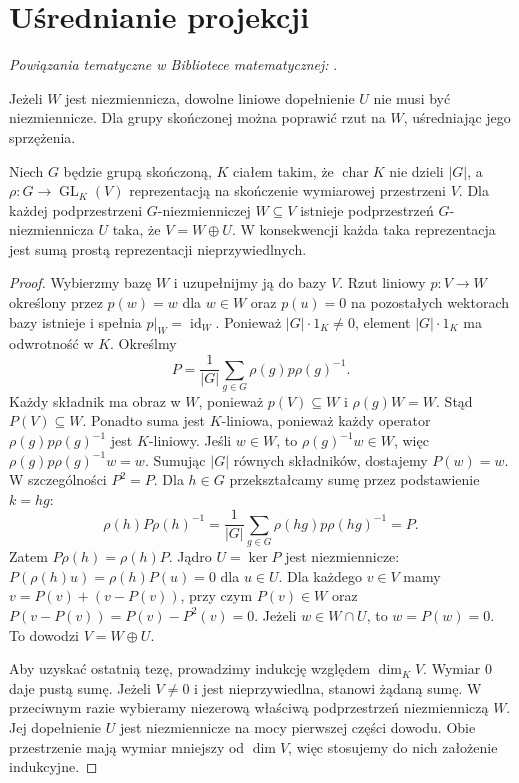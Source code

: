 \section{Uśrednianie projekcji}

\noindent\emph{Powiązania tematyczne w Bibliotece matematycznej:} .

Jeżeli $W$ jest niezmiennicza, dowolne liniowe dopełnienie
$U$ nie musi być niezmiennicze. Dla grupy skończonej
można poprawić rzut na $W$, uśredniając jego sprzężenia.
\begin{twierdzenie}[Maschke]\label{aa:tw:maschke}
Niech $G$ będzie grupą skończoną, $K$ ciałem takim, że
$\operatorname{char}K$ nie dzieli $|G|$, a $\rho:G\to
\operatorname{GL}_K(V)$ reprezentacją na skończenie wymiarowej
przestrzeni $V$. Dla każdej podprzestrzeni $G$-niezmienniczej
$W\subseteq V$ istnieje podprzestrzeń $G$-niezmiennicza $U$
taka, że $V=W\oplus U$. W konsekwencji każda taka reprezentacja
jest sumą prostą reprezentacji nieprzywiedlnych.
\end{twierdzenie}
\begin{proof}
Wybierzmy bazę $W$ i uzupełnijmy ją do bazy $V$.
Rzut liniowy $p:V\to W$ określony przez $p(w)=w$ dla $w\in W$
oraz $p(u)=0$ na pozostałych wektorach bazy istnieje i spełnia
$p|_W=\operatorname{id}_W$.
Ponieważ $|G|\cdot1_K\ne0$, element $|G|\cdot1_K$ ma
odwrotność w $K$. Określmy
\[
P=\frac1{|G|}\sum_{g\in G}\rho(g)p\rho(g)^{-1}.
\]
Każdy składnik ma obraz w $W$, ponieważ $p(V)\subseteq W$
i $\rho(g)W=W$. Stąd $P(V)\subseteq W$. Ponadto suma jest
$K$-liniowa, ponieważ każdy operator
$\rho(g)p\rho(g)^{-1}$ jest $K$-liniowy.
Jeśli $w\in W$, to $\rho(g)^{-1}w\in W$, więc
$\rho(g)p\rho(g)^{-1}w=w$. Sumując $|G|$ równych składników,
dostajemy $P(w)=w$. W szczególności $P^2=P$.
Dla $h\in G$ przekształcamy sumę przez podstawienie $k=hg$:
\[
\rho(h)P\rho(h)^{-1}=
\frac1{|G|}\sum_{g\in G}\rho(hg)p\rho(hg)^{-1}=P.
\]
Zatem $P\rho(h)=\rho(h)P$. Jądro $U=\ker P$ jest niezmiennicze:
$P(\rho(h)u)=\rho(h)P(u)=0$ dla $u\in U$.
Dla każdego $v\in V$ mamy $v=P(v)+(v-P(v))$, przy czym
$P(v)\in W$ oraz $P(v-P(v))=P(v)-P^2(v)=0$.
Jeżeli $w\in W\cap U$, to $w=P(w)=0$.
To dowodzi $V=W\oplus U$.

Aby uzyskać ostatnią tezę, prowadzimy indukcję względem
$\dim_KV$. Wymiar $0$ daje pustą sumę. Jeżeli $V\ne0$
i jest nieprzywiedlna, stanowi żądaną sumę. W przeciwnym
razie wybieramy niezerową właściwą podprzestrzeń niezmienniczą
$W$. Jej dopełnienie $U$ jest niezmiennicze na mocy pierwszej
części dowodu. Obie przestrzenie mają wymiar mniejszy od
$\dim V$, więc stosujemy do nich założenie indukcyjne.
\end{proof}
